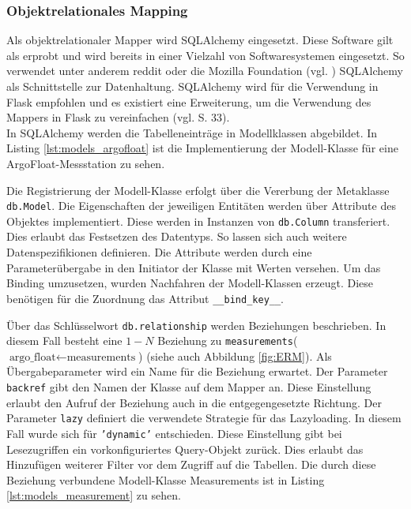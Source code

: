 \subsubsection{Objektrelationales Mapping}\label{sec:implementierungORM}


Als objektrelationaler Mapper wird SQLAlchemy eingesetzt. Diese Software gilt als erprobt und wird bereits in einer Vielzahl von Softwaresystemen eingesetzt. So verwendet unter anderem reddit oder die Mozilla Foundation  (vgl. \cite{Organiza62:online}) SQLAlchemy als Schnittstelle zur Datenhaltung. SQLAlchemy wird für die Verwendung in Flask empfohlen und es existiert eine Erweiterung, um die Verwendung des Mappers in Flask zu vereinfachen (vgl. \cite{openingtheflask} S. 33). \\


In SQLAlchemy werden die Tabelleneinträge in Modellklassen abgebildet. In Listing \ref{lst:models_argofloat} ist die Implementierung der Modell-Klasse für eine ArgoFloat-Messstation zu sehen.


Die Registrierung der Modell-Klasse erfolgt über die Vererbung der Metaklasse \texttt{db.Model}. Die Eigenschaften der jeweiligen Entitäten werden über Attribute des Objektes implementiert. Diese werden in Instanzen von \texttt{db.Column} transferiert. Dies erlaubt das Festsetzen des Datentyps. So lassen sich auch weitere Datenspezifikionen definieren.  Die Attribute werden durch eine Parameterübergabe in den Initiator der Klasse mit Werten versehen.
Um das Binding umzusetzen, wurden Nachfahren der Modell-Klassen erzeugt. Diese benötigen für die Zuordnung das Attribut \texttt{\_\_bind\_key\_\_}.

Über das Schlüsselwort \texttt{db.relationship} werden Beziehungen beschrieben. In diesem Fall besteht eine $1 - N$ Beziehung  zu \texttt{measurements}($\mbox{argo\_float} \leftarrow \mbox{measurements}$)   (siehe auch Abbildung \ref{fig:ERM}). Als Übergabeparameter wird ein Name für die Beziehung erwartet. Der Parameter \texttt{backref} gibt den Namen der Klasse auf dem Mapper an. Diese Einstellung erlaubt den Aufruf der Beziehung auch in die entgegengesetzte Richtung. Der Parameter \texttt{lazy} definiert die verwendete Strategie für das Lazyloading. In diesem Fall wurde sich für \texttt{'dynamic'} entschieden. Diese Einstellung gibt bei Lesezugriffen ein vorkonfiguriertes Query-Objekt zurück. Dies erlaubt das Hinzufügen weiterer Filter vor dem Zugriff auf die Tabellen. Die durch diese Beziehung verbundene Modell-Klasse Measurements ist in Listing \ref{lst:models_measurement} zu sehen.

